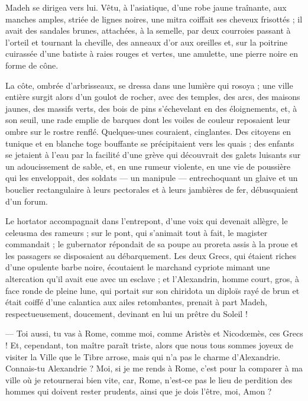 \documentclass[a4paper, 11pt, oneside, polutonikogreek, french]{article}
\begin{document}
Madeh se dirigea vers lui. Vêtu, à l'asiatique, d'une robe jaune traînante, aux manches amples, striée de lignes noires, une mitra coiffait ses cheveux frisottés ; il avait des sandales brunes, attachées, à la semelle, par deux courroies passant à l'orteil et tournant la cheville, des anneaux d'or aux oreilles et, sur la poitrine cuirassée d'une batiste à raies rouges et vertes, une amulette, une pierre noire en forme de cône.

La côte, ombrée d'arbrisseaux, se dressa dans une lumière qui rosoya ; une ville entière surgit alors d'un goulot de rocher, avec des temples, des arcs, des maisons jaunes, des massifs verts, des bois de pins s'échevelant en des éloignements, et, à son seuil, une rade emplie de barques dont les voiles de couleur reposaient leur ombre sur le rostre renflé. Quelques-unes couraient, cinglantes. Des citoyens en tunique et en blanche toge bouffante se précipitaient vers les quais ; des enfants se jetaient à l'eau par la facilité d'une grève qui découvrait des galets luisants sur un adoucissement de sable, et, en une rumeur violente, en une vie de poussière qui les enveloppait, des soldats --- un manipule --- entrechoquant un glaive et un bouclier rectangulaire à leurs pectorales et à leurs jambières de fer, débusquaient d'un forum.

Le hortator accompagnait dans l'entrepont, d'une voix qui devenait allègre, le celeusma des rameurs ; sur le pont, qui s'animait tout à fait, le magister commandait ; le gubernator répondait de sa poupe au proreta assis à la proue et les passagers se disposaient au débarquement. Les deux Grecs, qui étaient riches d'une opulente barbe noire, écoutaient le marchand cypriote mimant une altercation qu'il avait eue avec un esclave ; et l'Alexandrin, homme court, gros, à face ronde de pleine lune, qui portait sur son chiridota un diploïs rayé de brun et était coiffé d'une calantica aux ailes retombantes, prenait à part Madeh, respectueusement, doucement, devinant en lui un prêtre du Soleil !

--- Toi aussi, tu vas à Rome, comme moi, comme Aristès et Nicodœmès, ces Grecs ! Et, cependant, ton maître paraît triste, alors que nous tous sommes joyeux de visiter la Ville que le Tibre arrose, mais qui n'a pas le charme d'Alexandrie. Connais-tu Alexandrie ? Moi, si je me rends à Rome, c'est pour la comparer à ma ville où je retournerai bien vite, car, Rome, n'est-ce pas le lieu de perdition des hommes qui doivent rester prudents, ainsi que je dois l'être, moi, Amon ?
\end{document}
